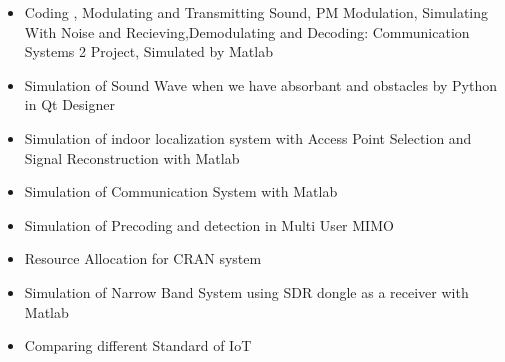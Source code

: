 \documentclass[10pt,a4paper,sans]{moderncv} %
\begin{document}
\begin{itemize}
\item Coding , Modulating and Transmitting Sound, PM Modulation, Simulating With Noise and Recieving,Demodulating and Decoding: Communication Systems 2 Project, Simulated by Matlab 
\item Simulation of Sound Wave when we have absorbant and obstacles by Python in Qt Designer
\item Simulation of indoor localization system with Access Point Selection and Signal Reconstruction with Matlab
\item Simulation of  Communication System with Matlab
\item Simulation of Precoding and detection in  Multi User MIMO 
\item Resource Allocation for CRAN system 
\item Simulation of Narrow Band System using SDR dongle as a receiver with Matlab 
\item Comparing different Standard of IoT 
\end{itemize}

\end{document}
